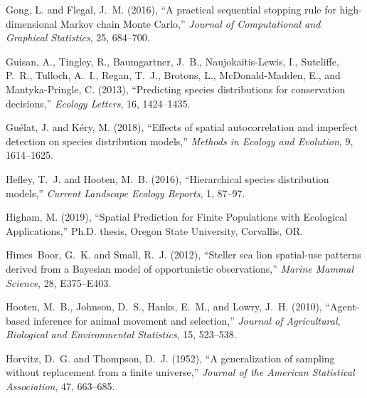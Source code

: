 \documentclass[11pt, titlepage]{article}
\begin{document}
\begin{spacing}{1.9}
\begin{flushleft}
\begin{thebibliography}{59}
Gong, L. and Flegal, J.~M. (2016), \enquote{A practical sequential stopping
  rule for high-dimensional {Markov} chain {Monte} {Carlo},} \textit{Journal of
  Computational and Graphical Statistics}, 25, 684--700.

Guisan, A., Tingley, R., Baumgartner, J.~B., Naujokaitis-Lewis, I., Sutcliffe,
  P.~R., Tulloch, A.~I., Regan, T.~J., Brotons, L., McDonald-Madden, E., and
  Mantyka-Pringle, C. (2013), \enquote{Predicting species distributions for
  conservation decisions,} \textit{Ecology Letters}, 16, 1424--1435.

Guélat, J. and Kéry, M. (2018), \enquote{Effects of spatial autocorrelation
  and imperfect detection on species distribution models,} \textit{Methods in
  Ecology and Evolution}, 9, 1614--1625.

Hefley, T.~J. and Hooten, M.~B. (2016), \enquote{Hierarchical species
  distribution models,} \textit{Current Landscape Ecology Reports}, 1, 87--97.

Higham, M. (2019), \enquote{Spatial {Prediction} for {Finite} {Populations}
  with {Ecological} {Applications},} Ph.D. thesis, Oregon State University,
  Corvallis, OR.

Himes~Boor, G.~K. and Small, R.~J. (2012), \enquote{Steller sea lion
  spatial-use patterns derived from a {Bayesian} model of opportunistic
  observations,} \textit{Marine Mammal Science}, 28, E375--E403.

Hooten, M.~B., Johnson, D.~S., Hanks, E.~M., and Lowry, J.~H. (2010),
  \enquote{Agent-based inference for animal movement and selection,}
  \textit{Journal of Agricultural, Biological and Environmental Statistics},
  15, 523--538.

Horvitz, D.~G. and Thompson, D.~J. (1952), \enquote{A generalization of
  sampling without replacement from a finite universe,} \textit{Journal of the
  American Statistical Association}, 47, 663--685.


\end{thebibliography}
\end{flushleft}
\end{spacing}
\end{document}
